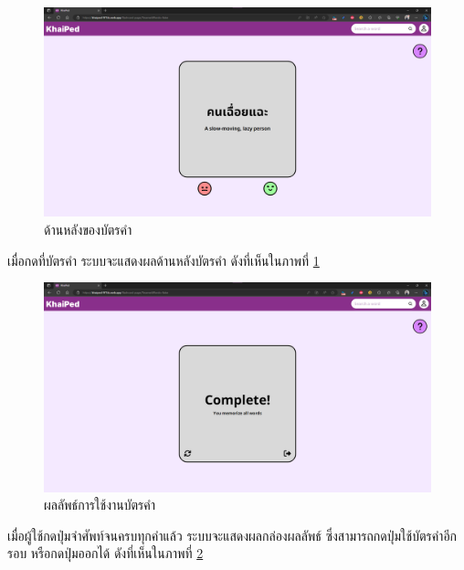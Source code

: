 \documentclass[12pt,oneside,openright,a4paper]{cpe-thai-project}
\begin{document}
\pagebreak
\begin{figure}[!h]\centering
	\includegraphics[width=\textwidth, keepaspectratio=true]{image/chap4/UI/flashcard/back.png}
	\caption{{ด้านหลังของบัตรคำ}}\label{fig:chap4UIFlashBack}
\end{figure}
\hspace{1cm}
เมื่อกดที่บัตรคำ ระบบจะแสดงผลด้านหลังบัตรคำ ดังที่เห็นในภาพที่ \ref{fig:chap4UIFlashBack}

\begin{figure}[!h]\centering
	\includegraphics[width=\textwidth, keepaspectratio=true]{image/chap4/UI/flashcard/result.png}
	\caption{{ผลลัพธ์การใช้งานบัตรคำ}}\label{fig:chap4UIFlashResult}
\end{figure}
\hspace{1cm}
เมื่อผู้ใช้กดปุ่มจำศัพท์จนครบทุกคำแล้ว ระบบจะแสดงผลกล่องผลลัพธ์ ซึ่งสามารถกดปุ่มใช้บัตรคำอีกรอบ หรือกดปุ่มออกได้
ดังที่เห็นในภาพที่ \ref{fig:chap4UIFlashResult}
\end{document}
